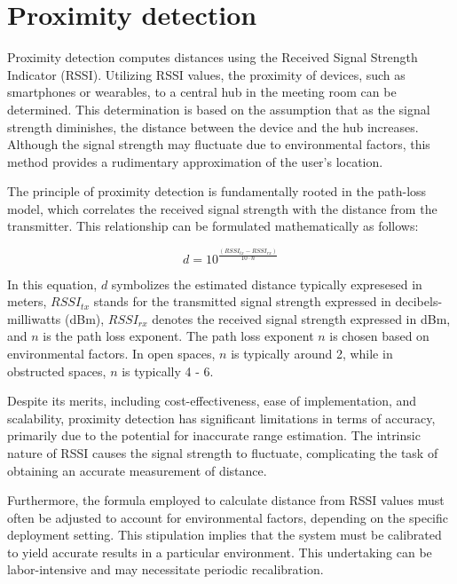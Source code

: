\section{Proximity detection}\label{sec:proximity_detection}
Proximity detection computes distances using the Received Signal Strength Indicator (RSSI).
Utilizing RSSI values, the proximity of devices, such as smartphones or wearables, to a central hub in the meeting room can be determined. 
This determination is based on the assumption that as the signal strength diminishes, the distance between the device and the hub increases. 
Although the signal strength may fluctuate due to environmental factors, this method provides a rudimentary approximation of the user's location.\cite{spachosBLEBeaconsIndoor2020}

The principle of proximity detection is fundamentally rooted in the path-loss model, which correlates the received signal strength with the distance from the transmitter. This relationship can be formulated mathematically as follows:\cite{spachosBLEBeaconsIndoor2020}

$$
d = 10^{ \frac{(RSSI_{tx} - RSSI_{rx})}{10 \cdot n}}
$$

In this equation, \(d\) symbolizes the estimated distance typically expresesed in meters, \(RSSI_{tx}\) stands for the transmitted signal strength expressed in decibels-milliwatts (dBm), \(RSSI_{rx}\) denotes the received signal strength expressed in dBm, and \(n\) is the path loss exponent.
The path loss exponent \(n\) is chosen based on environmental factors. 
In open spaces, \(n\) is typically around 2, while in obstructed spaces, \(n\) is typically 4 - 6.\cite{spachosBLEBeaconsIndoor2020, mathuranathanLogDistancePath2013}

Despite its merits, including cost-effectiveness, ease of implementation, and scalability, proximity detection has significant limitations in terms of accuracy, primarily due to the potential for inaccurate range estimation. The intrinsic nature of RSSI causes the signal strength to fluctuate, complicating the task of obtaining an accurate measurement of distance.\cite{spachosBLEBeaconsIndoor2020}

Furthermore, the formula employed to calculate distance from RSSI values must often be adjusted to account for environmental factors, depending on the specific deployment setting. This stipulation implies that the system must be calibrated to yield accurate results in a particular environment. This undertaking can be labor-intensive and may necessitate periodic recalibration.\cite{spachosBLEBeaconsIndoor2020}

